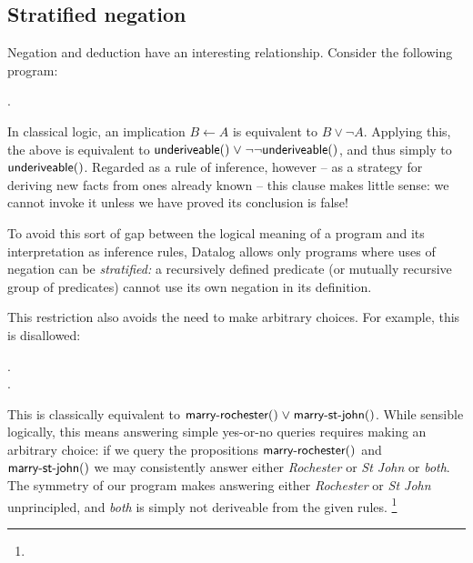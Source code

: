 

\subsection{Stratified negation}
\label{section-stratified-negation}

Negation and deduction have an interesting relationship.
%
Consider the following program:

\nopagebreak[1]
\begin{datalog}
   \gets \neg {}.
\end{datalog}

\noindent
In classical logic, an implication $B \gets A$ is equivalent to $B \vee \neg A$.
Applying this, the above is equivalent to $\atom{underiveable}{} \vee
\neg\neg\atom{underiveable}{}$, and thus simply to $\text{\sffamily underiveable}({})$.
%
Regarded as a rule of inference, however -- as a strategy for deriving new facts
from ones already known -- this clause makes little sense: we cannot invoke it
unless we have proved its conclusion is false!

To avoid this sort of gap between the logical meaning of a program and its
interpretation as inference rules, Datalog allows only programs where uses of
negation can be \emph{stratified:} a recursively defined predicate (or mutually
recursive group of predicates) cannot use its own negation in its definition. 

This restriction also avoids the need to make arbitrary choices. For example,
this is disallowed:

\nopagebreak[1]
\begin{datalog}
   \gets \neg {}.\\
   \gets \neg {}.
\end{datalog}

This is classically equivalent to $\atom{marry-rochester}{} \vee
\atom{marry-st-john}{}$. While sensible logically, this means answering simple
yes-or-no queries requires making an arbitrary choice: if we query the
propositions $\text{\sffamily marry-rochester}({})$ and $\text{\sffamily marry-st-john}({})$ we
may consistently answer either \emph{Rochester} or \emph{St John} or
\emph{both}.
%
The symmetry of our program makes answering either
\emph{Rochester} or \emph{St John} unprincipled, and \emph{both} is simply
not deriveable from the given rules.%
%
\footnote{}


